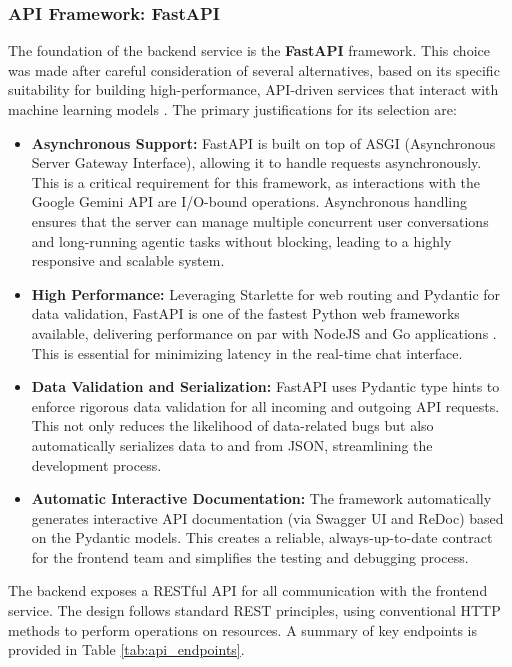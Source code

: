 \subsubsection{API Framework: FastAPI}
\label{sec:api_framework}

The foundation of the backend service is the \textbf{FastAPI} framework. This choice was made after careful consideration of several alternatives, based on its specific suitability for building high-performance, API-driven services that interact with machine learning models \cite{FIND_CITATION_HERE}. The primary justifications for its selection are:

\begin{itemize}
    \item \textbf{Asynchronous Support:} FastAPI is built on top of ASGI (Asynchronous Server Gateway Interface), allowing it to handle requests asynchronously. This is a critical requirement for this framework, as interactions with the Google Gemini API are I/O-bound operations. Asynchronous handling ensures that the server can manage multiple concurrent user conversations and long-running agentic tasks without blocking, leading to a highly responsive and scalable system.
    \item \textbf{High Performance:} Leveraging Starlette for web routing and Pydantic for data validation, FastAPI is one of the fastest Python web frameworks available, delivering performance on par with NodeJS and Go applications \cite{FIND_CITATION_HERE}. This is essential for minimizing latency in the real-time chat interface.
    \item \textbf{Data Validation and Serialization:} FastAPI uses Pydantic type hints to enforce rigorous data validation for all incoming and outgoing API requests. This not only reduces the likelihood of data-related bugs but also automatically serializes data to and from JSON, streamlining the development process.
    \item \textbf{Automatic Interactive Documentation:} The framework automatically generates interactive API documentation (via Swagger UI and ReDoc) based on the Pydantic models. This creates a reliable, always-up-to-date contract for the frontend team and simplifies the testing and debugging process.
\end{itemize}

The backend exposes a RESTful API for all communication with the frontend service. The design follows standard REST principles, using conventional HTTP methods to perform operations on resources. A summary of key endpoints is provided in Table \ref{tab:api_endpoints}.


